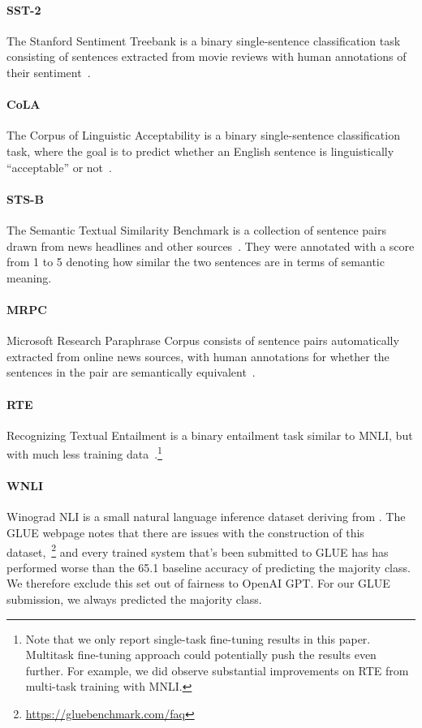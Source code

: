 \paragraph{SST-2} The Stanford Sentiment Treebank is a binary single-sentence classification task consisting of sentences extracted from movie reviews with human annotations of their sentiment~\cite{socher-etal:2013:_recur}.

\paragraph{CoLA} The Corpus of Linguistic Acceptability is a binary single-sentence classification task, where the goal is to predict whether an English sentence is linguistically ``acceptable'' or not~\cite{warstadt-singh-bowman:2018:_corpus}.

\paragraph{STS-B} The Semantic Textual Similarity Benchmark is a collection of sentence pairs drawn from news headlines and other sources~\cite{cer-etal:2017}. They were annotated with a score from 1 to 5 denoting how similar the two sentences are in terms of semantic meaning. 

\paragraph{MRPC} Microsoft Research Paraphrase Corpus consists of sentence pairs automatically extracted from online news sources, with human annotations for whether the sentences in the pair are semantically equivalent~\cite{dolan-brockett:2005:_autom}.

\paragraph{RTE} Recognizing Textual Entailment is a binary entailment task similar to MNLI, but with much less training data~\cite{bentivogli-etal:2009}.\footnote{Note that we only report single-task fine-tuning results in this paper. Multitask fine-tuning approach could potentially push
the results even further. For example, we did observe substantial improvements on RTE from multi-task training with MNLI.}

\paragraph{WNLI} Winograd NLI is a small natural language inference dataset
deriving from \cite{levesque-davis-morgenstern:2011:_winog}. The GLUE webpage notes that there are issues with the construction of this dataset,~\footnote{\url{https://gluebenchmark.com/faq}} and every trained system that's been submitted to GLUE has has performed worse than the 65.1 baseline accuracy of predicting the majority class. We therefore exclude this set out of fairness to OpenAI GPT. For our GLUE submission, we always predicted the majority class.

